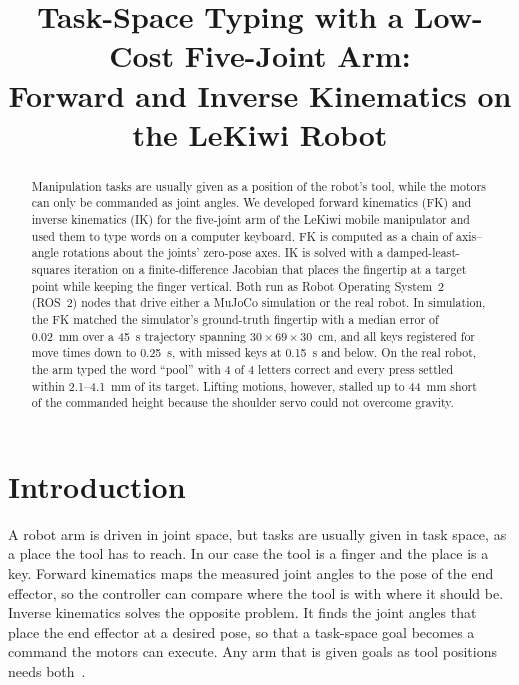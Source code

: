 \documentclass[conference]{IEEEtran}
\begin{document}
\title{Task-Space Typing with a Low-Cost Five-Joint Arm:\\Forward and Inverse Kinematics on the LeKiwi Robot}

\author{
}

\maketitle

\begin{abstract}
Manipulation tasks are usually given as a position of the robot's tool, while the motors can only be commanded as joint angles. We developed forward kinematics (FK) and inverse kinematics (IK) for the five-joint arm of the LeKiwi mobile manipulator and used them to type words on a computer keyboard. FK is computed as a chain of axis--angle rotations about the joints' zero-pose axes. IK is solved with a damped-least-squares iteration on a finite-difference Jacobian that places the fingertip at a target point while keeping the finger vertical. Both run as Robot Operating System~2 (ROS~2) nodes that drive either a MuJoCo simulation or the real robot. In simulation, the FK matched the simulator's ground-truth fingertip with a median error of 0.02~mm over a 45~s trajectory spanning $30\times69\times30$~cm, and all keys registered for move times down to 0.25~s, with missed keys at 0.15~s and below. On the real robot, the arm typed the word ``pool'' with 4 of 4 letters correct and every press settled within 2.1--4.1~mm of its target. Lifting motions, however, stalled up to 44~mm short of the commanded height because the shoulder servo could not overcome gravity.
\end{abstract}

\section{Introduction}

A robot arm is driven in joint space, but tasks are usually given in task space, as a place the tool has to reach. In our case the tool is a finger and the place is a key. Forward kinematics maps the measured joint angles to the pose of the end effector, so the controller can compare where the tool is with where it should be. Inverse kinematics solves the opposite problem. It finds the joint angles that place the end effector at a desired pose, so that a task-space goal becomes a command the motors can execute. Any arm that is given goals as tool positions needs both~\cite{slides}.
\end{document}
